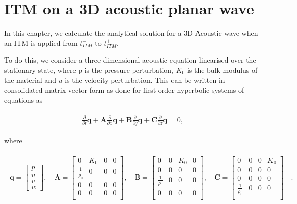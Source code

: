 \section{\ac{ITM} on a 3D acoustic planar wave}\label{section:3DITMAcoustic}
In this chapter, we calculate the analytical solution for a 3D Acoustic wave when an \ac{ITM} is applied from $t_{ITM}^-$ to $t_{ITM}^+$.

To do this, we consider a three dimensional acoustic equation linearised over the stationary state, where p is the pressure perturbation, $K_0$ is the bulk
modulus of the material and $u$ is the velocity perturbation.
This can be written in consolidated matrix vector form as done for first order hyperbolic systems of equations as

\begin{align}
    \begin{split}
        \frac{\partial}{\partial t}\mathbf{q} + \mathbf{A}\frac{\partial}{\partial x}\mathbf{q} + \mathbf{B}\frac{\partial}{\partial y}\mathbf{q} + 
        \mathbf{C}\frac{\partial}{\partial z}\mathbf{q} = 0,
    \end{split}
    \label{eq:3Dacoustic}
\end{align}

where 

\begin{align}
    \begin{split}
        \mathbf{q} = \begin{bmatrix}
            p \\
            u \\
            v \\
            w 
        \end{bmatrix}, \quad
        \mathbf{A} = \begin{bmatrix}
            0 & K_0 & 0 & 0 \\
            \frac{1}{\rho_0} & 0 & 0 & 0 \\
            0 & 0 & 0 & 0 \\
            0 & 0 & 0 & 0 \\
        \end{bmatrix}, \quad
        \mathbf{B} = \begin{bmatrix}
            0 & 0 & K_0 & 0 \\
            0 & 0 & 0 & 0 \\
            \frac{1}{\rho_0} & 0 & 0 & 0 \\
            0 & 0 & 0 & 0 \\
        \end{bmatrix}, \quad
        \mathbf{C} = \begin{bmatrix}
            0 & 0 & 0 & K_0 \\
            0 & 0 & 0 & 0 \\
            0 & 0 & 0 & 0 \\
            \frac{1}{\rho_0} & 0 & 0 & 0 \\
        \end{bmatrix} \quad .
    \end{split}
\end{align}

